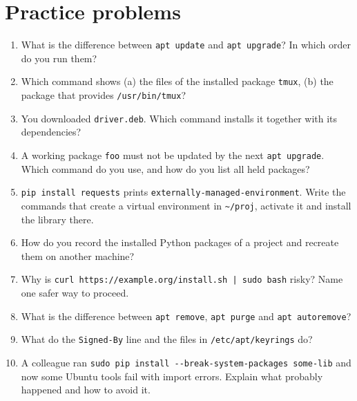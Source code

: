 \section*{Practice problems}
\begin{enumerate}[label=\textbf{\thechapter.\arabic*}]
  \item What is the difference between \texttt{apt update} and \texttt{apt upgrade}? In which order do you run them?
  \item Which command shows (a) the files of the installed package \texttt{tmux}, (b) the package that provides \texttt{/usr/bin/tmux}?
  \item You downloaded \texttt{driver.deb}. Which command installs it together with its dependencies?
  \item A working package \texttt{foo} must not be updated by the next \texttt{apt upgrade}. Which command do you use, and how do you list all held packages?
  \item \texttt{pip install requests} prints \texttt{externally-managed-environment}. Write the commands that create a virtual environment in \texttt{\textasciitilde/proj}, activate it and install the library there.
  \item How do you record the installed Python packages of a project and recreate them on another machine?
  \item Why is \verb!curl https://example.org/install.sh | sudo bash! risky? Name one safer way to proceed.
  \item What is the difference between \texttt{apt remove}, \texttt{apt purge} and \texttt{apt autoremove}?
  \item What do the \texttt{Signed-By} line and the files in \texttt{/etc/apt/keyrings} do?
  \item[\textbf{\thechapter.10}$\star$] A colleague ran \verb|sudo pip install --break-system-packages some-lib| and now some Ubuntu tools fail with import errors. Explain what probably happened and how to avoid it.
\end{enumerate}
